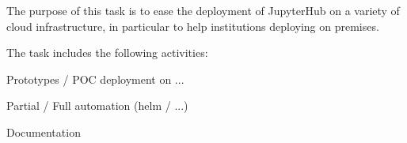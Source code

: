 \begin{task}[title=Ease deployment of JupyterHub on a variety of
  infrastructure (on premises, ...),
  id=task-id, %
  lead=X,
  PM=6, %
  wphases={0-24}, %
  partners={X,PSud}] %

  The purpose of this task is to ease the deployment of JupyterHub on
  a variety of cloud infrastructure, in particular to help
  institutions deploying on premises.



  The task includes the following activities:
  \begin{compactitem}
  \item Prototypes / POC deployment  on ...
  \item Partial / Full automation (helm / ...)
  \item Documentation
  \end{compactitem}
\end{task}
